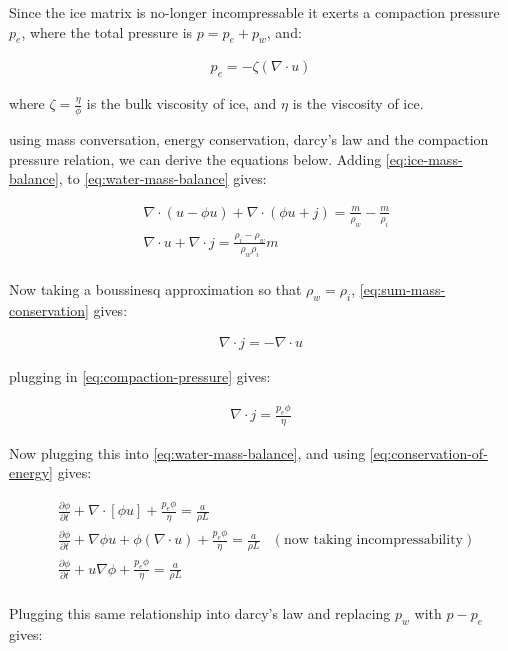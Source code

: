 \documentclass[a4paper,12pt]{article}
\newcommand{\pd}[2]{\frac{\partial #1}{\partial #2}}
\begin{document}
Since the ice matrix is no-longer incompressable it exerts a compaction pressure $p_e$, where the total pressure is $p = p_e + p_w$, and:

\begin{align*}
  p_e = - \zeta (\nabla \cdot u) \tag{5} \label{eq:compaction-pressure}
\end{align*}

where $\zeta = \frac{\eta}{\phi}$ is the bulk viscosity of ice, and $\eta$ is the viscosity of ice.


using mass conversation, energy conservation, darcy's law and the compaction pressure relation, we can derive the equations below. Adding \eqref{eq:ice-mass-balance}, to \eqref{eq:water-mass-balance} gives:

\begin{align*}
  &\nabla \cdot (u - \phi u) + \nabla \cdot(\phi u + j) = \frac{m}{\rho_w} - \frac{m}{\rho_i}\\
  &\nabla \cdot u + \nabla \cdot j = \frac{\rho_i - \rho_w}{\rho_w\rho_i}m \tag{6} \label{eq:sum-mass-conservation}\\
\end{align*}

Now taking a boussinesq approximation so that $\rho_w = \rho_i$, \eqref{eq:sum-mass-conservation} gives:

\begin{align*}
  \nabla \cdot j = - \nabla \cdot u
\end{align*}

plugging in \eqref{eq:compaction-pressure} gives:

\begin{align*}
  \nabla \cdot j = \frac{p_e\phi}{\eta}
\end{align*}

Now plugging this into \eqref{eq:water-mass-balance}, and using \eqref{eq:conservation-of-energy} gives:

\begin{align*}
  &\pd{\phi}{t} + \nabla \cdot [\phi u] + \frac{p_e\phi}{\eta} = \frac{a}{\rho L} \\
  &\pd{\phi}{t} + \nabla \phi u + \phi(\nabla \cdot u) + \frac{p_e\phi}{\eta} = \frac{a}{\rho L} & (\text{now taking incompressability}) \\
  &\pd{\phi}{t} + u \nabla \phi + \frac{p_e\phi}{\eta} = \frac{a}{\rho L} \\
\end{align*}


Plugging this same relationship into darcy's law and replacing $p_w$ with $p - p_e$ gives:
\end{document}
